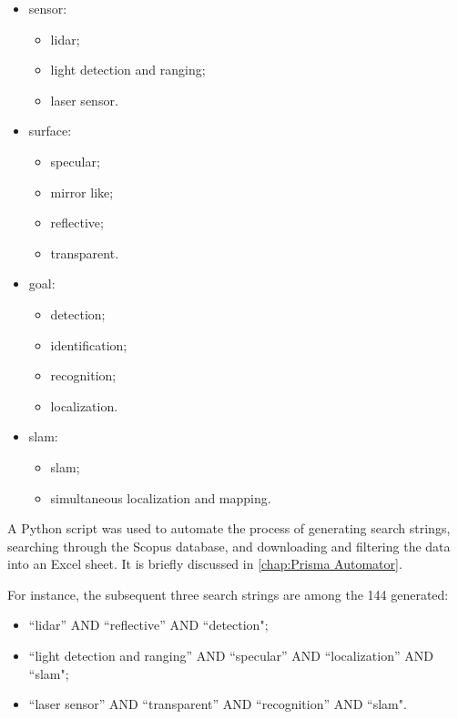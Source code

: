 \begin{itemize}
    \item sensor:
    \begin{itemize}
        \item lidar;
        \item light detection and ranging;
        \item laser sensor.
    \end{itemize}
    \item surface:
    \begin{itemize}
        \item specular;
        \item mirror like;
        \item reflective;
        \item transparent.
    \end{itemize}
    \item goal:
    \begin{itemize}
        \item detection;
        \item identification;
        \item recognition;
        \item localization.
    \end{itemize}
    \item slam:
    \begin{itemize}
        \item slam;
        \item simultaneous localization and mapping.
    \end{itemize}
\end{itemize}

A Python script was used to automate the process of generating search strings, searching through the Scopus database, and downloading and filtering the data into an Excel sheet. It is briefly discussed in \autoref{chap:Prisma Automator}.

For instance, the subsequent three search strings are among the 144 generated:
\begin{itemize}
    \item ``lidar'' AND ``reflective'' AND ``detection";
    \item ``light detection and ranging'' AND ``specular'' AND ``localization'' AND ``slam";
    \item ``laser sensor'' AND ``transparent'' AND ``recognition'' AND ``slam".
\end{itemize}

